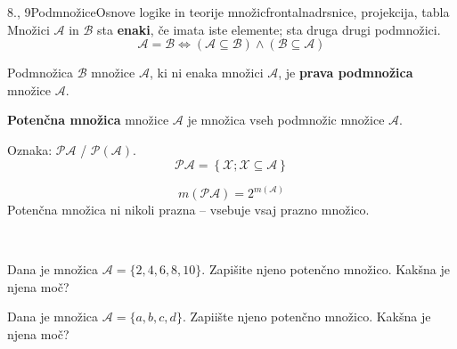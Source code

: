 \begin{priprava}{8., 9}{}{Podmnožice}{Osnove logike in teorije množic}{frontalna}{drsnice, projekcija, tabla}
        Množici $\mathcal{A}$ in $\mathcal{B}$ sta \textbf{enaki}, če imata iste elemente; 
        sta druga drugi podmnožici.
        $$\mathcal{A}=\mathcal{B}\Leftrightarrow(\mathcal{A}\subseteq\mathcal{B})\land(\mathcal{B}\subseteq\mathcal{A})$$

        Podmnožica $\mathcal{B}$ množice $\mathcal{A}$, ki ni enaka množici $\mathcal{A}$, 
        je \textbf{prava podmnožica} množice $\mathcal{A}$.
        \newline

        \textbf{Potenčna množica} množice $\mathcal{A}$ je množica vseh podmnožic množice $\mathcal{A}$.
        
        Oznaka: $\mathbf{\mathcal{P}\mathcal{A}}$ / $\mathbf{\mathcal{P}(\mathcal{A})}$.
        $$ \mathcal{PA}=\left\{\mathcal{X}; \mathcal{X}\subseteq\mathcal{A} \right\}$$
    

        $$ m(\mathcal{PA})=2^{m(\mathcal{A})}$$
        Potenčna množica ni nikoli prazna -- vsebuje vsaj prazno množico.


        ~\\
        \begin{naloga}
            Dana je množica $\mathcal{A}=\{2,4,6,8,10\}$. Zapišite njeno potenčno množico. 
            Kakšna je njena moč?
        \end{naloga}

        \begin{naloga}
            Dana je množica $\mathcal{A}=\{a,b,c,d\}$. Zapiište njeno potenčno množico. 
            Kakšna je njena moč?
        \end{naloga}


\end{priprava}